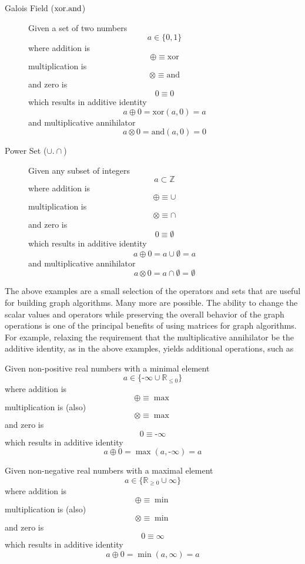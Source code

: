 \begin{description}
\item[Galois Field (${{\rm xor}}.{{\rm and}}$)] Given a set of two numbers
$$
  a \in \{0,1\}
$$
where addition is
$$
  \oplus \equiv \text{xor}
$$
multiplication is
$$
  \otimes \equiv \text{and}
$$
and zero is
$$
  0 \equiv 0
$$
which results in additive identity
$$
  a \oplus 0  =  \text{xor}(a,0) = a
$$
and multiplicative annihilator
$$
  a \otimes 0 = \text{and}(a,0) = 0
$$

\item[Power Set (${\cup}.{\cap}$)] Given any subset of integers
$$
  a \subset \mathbb{Z}
$$
where addition is
$$
  \oplus \equiv \cup
$$
multiplication is
$$
  \otimes \equiv \cap
$$
and zero is
$$
  0 \equiv \emptyset
$$
which results in additive identity
$$
  a \oplus 0  =   a \cup \emptyset = a
$$
and multiplicative annihilator
$$
  a \otimes 0 = a \cap \emptyset = \emptyset
$$
\end{description}

The above examples are a small selection of the operators and sets that are useful for building graph algorithms.  Many more are possible.  The ability to change the  scalar values and operators while preserving the overall behavior of the graph operations is one of the principal benefits of using matrices for graph algorithms.  For example, relaxing the requirement that the multiplicative annihilator be the additive identity, as in the above examples, yields additional operations, such as

\begin{description}
\item[Max-Max Algebra (${\max}.{\max}$)] Given non-positive real numbers with a minimal element
$$
  a \in \{\text{-}\infty \cup \mathbb{R}_{\leq 0} \}
$$
where addition is
$$
  \oplus \equiv \max
$$
multiplication is (also)
$$
  \otimes \equiv \max
$$
and zero is
$$
  0 \equiv \text{-}\infty
$$
which results in additive identity
$$
  a \oplus 0  =  \max(a,\text{-}\infty) = a
$$

\item[Min-Min Algebra (${\min}.{\max}$)] Given non-negative real numbers with a maximal element
$$
  a \in \{\mathbb{R}_{\geq 0} \cup \infty\}
$$
where addition is
$$
  \oplus \equiv \min
$$
multiplication is (also) 
$$
  \otimes \equiv \min
$$
and zero is
$$
  0 \equiv \infty
$$
which results in additive identity
$$
  a \oplus 0  =  \min(a,\infty) = a
$$
\end{description}

